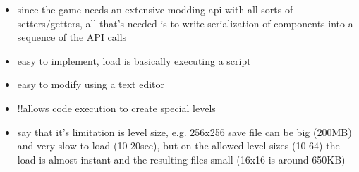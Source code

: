 \begin{itemize}
    \item since the game needs an extensive modding api with all sorts of setters/getters,
	    all that's needed is to write serialization of components into a sequence of
	    the API calls
    \item easy to implement, load is basically executing a script
    \item easy to modify using a text editor
    \item !!allows code execution to create special levels
    \item say that it's limitation is level size, e.g. 256x256 save file can be big (200MB) and
	    very slow to load (10-20sec), but on the allowed level sizes (10-64) the load
	    is almost instant and the resulting files small (16x16 is around 650KB)
\end{itemize}
